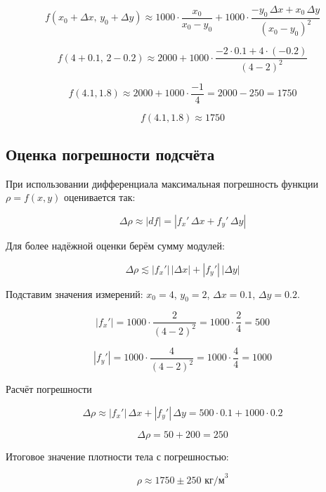 \[
f(x_0 + \Delta x,\, y_0 + \Delta y)
\approx
1000 \cdot \frac{x_0}{x_0 - y_0}
+ 1000 \cdot \frac{-y_0\,\Delta x + x_0\,\Delta y}{(x_0 - y_0)^2}
\]

\[
f(4 + 0.1,\, 2 - 0.2)
\approx
2000
+ 1000 \cdot \frac{-2 \cdot 0.1 + 4 \cdot (-0.2)}{(4 - 2)^2}
\]

\[
f(4.1, 1.8) \approx 2000 + 1000 \cdot \frac{-1}{4} = 2000 - 250 = 1750
\]

\[
\boxed{f(4.1, 1.8) \approx 1750}
\]

\subsection{Оценка погрешности подсчёта}

При использовании дифференциала максимальная погрешность функции $\rho = f(x,y)$ оценивается так:

\[
\Delta \rho \approx |df| = \left| f_x' \, \Delta x + f_y' \, \Delta y \right|
\]

Для более надёжной оценки берём сумму модулей:

\[
\Delta \rho \lesssim |f_x'| \, |\Delta x| + |f_y'| \, |\Delta y|
\]

Подставим значения измерений: $x_0 = 4$, $y_0 = 2$, $\Delta x = 0.1$, $\Delta y = 0.2$.

\[
|f_x'| = 1000 \cdot \frac{2}{(4 - 2)^2} = 1000 \cdot \frac{2}{4} = 500
\]

\[
|f_y'| = 1000 \cdot \frac{4}{(4 - 2)^2} = 1000 \cdot \frac{4}{4} = 1000
\]

Расчёт погрешности

\[
\Delta \rho \approx |f_x'| \, \Delta x + |f_y'| \, \Delta y = 500 \cdot 0.1 + 1000 \cdot 0.2
\]

\[
\Delta \rho = 50 + 200 = 250
\]

Итоговое значение плотности тела с погрешностью:

\[
\boxed{\rho \approx 1750 \pm 250 \text{ кг/м}^3}
\]

